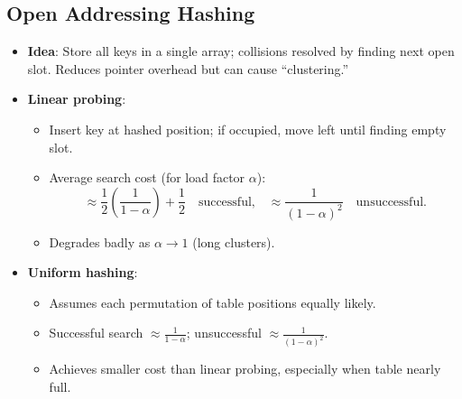 \documentclass[11pt,letterpaper]{article}
\begin{document}
\subsection{Open Addressing Hashing}
\begin{itemize}
  \item \textbf{Idea}: Store all keys in a single array; collisions resolved by finding next open slot. Reduces pointer overhead but can cause ``clustering.''
  \item \textbf{Linear probing}:
    \begin{itemize}
      \item Insert key at hashed position; if occupied, move left until finding empty slot.
      \item Average search cost (for load factor $\alpha$):
        \[
          \approx \frac{1}{2}\left(\frac{1}{1-\alpha}\right)+\frac{1}{2}
          \quad\text{successful,}
          \quad
          \approx \frac{1}{(1-\alpha)^2}
          \quad\text{unsuccessful.}
        \]
      \item Degrades badly as $\alpha\to1$ (long clusters).
    \end{itemize}
  \item \textbf{Uniform hashing}:
    \begin{itemize}
      \item Assumes each permutation of table positions equally likely.
      \item Successful search $\approx \frac{1}{1-\alpha}$; unsuccessful $\approx \frac{1}{(1-\alpha)^2}$.
      \item Achieves smaller cost than linear probing, especially when table nearly full.
    \end{itemize}
\end{itemize}

\end{document}
